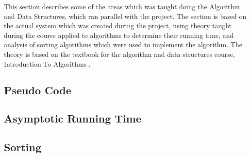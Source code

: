 This section describes some of the areas which was taught doing the Algorithm and Data Structures, which ran parallel with the project. The section is based on the actual system which was created during the project, using theory taught during the course applied to algorithms to determine their running time, and analysis of sorting algorithms which were used to implement the algorithm. The theory is based on the textbook for the algorithm and data structures course, Introduction To Algorithms \cite{IntroToAlgorithms}.

\subsection{Pseudo Code}
\label{PesudoCode}

\subsection{Asymptotic Running Time}
\label{AsymptoticTime}

\subsection{Sorting}
\label{Sorting}
